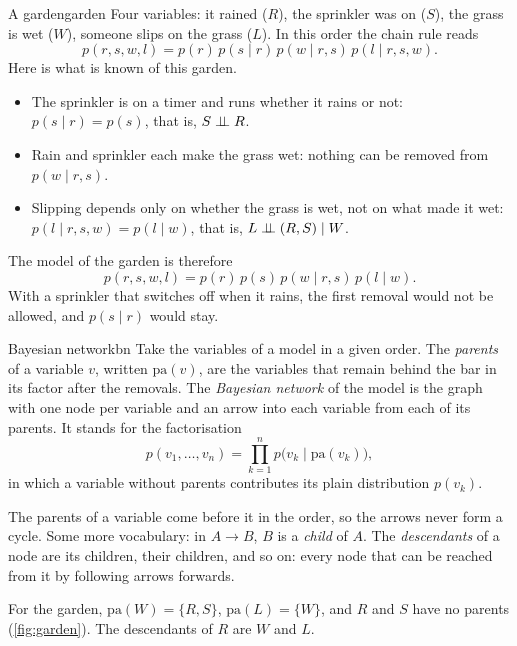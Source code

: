 \begin{example}{A garden}{garden}
Four variables: it rained ($R$), the sprinkler was on ($S$), the grass is
wet ($W$), someone slips on the grass ($L$). In this order the chain rule
reads
\[
  p(r,s,w,l)=p(r)\,p(s\mid r)\,p(w\mid r,s)\,p(l\mid r,s,w).
\]
Here is what is known of this garden.
\begin{itemize}[nosep]
  \item The sprinkler is on a timer and runs whether it rains or not:
    $p(s\mid r)=p(s)$, that is, $S\mathrel{\perp\!\!\!\perp} R$.
  \item Rain and sprinkler each make the grass wet: nothing can be removed
    from $p(w\mid r,s)$.
  \item Slipping depends only on whether the grass is wet, not on what
    made it wet: $p(l\mid r,s,w)=p(l\mid w)$, that is,
    $L\mathrel{\perp\!\!\!\perp}(R,S)\mid W$.
\end{itemize}
The model of the garden is therefore
\[
  p(r,s,w,l)=p(r)\,p(s)\,p(w\mid r,s)\,p(l\mid w).
\]
With a sprinkler that switches off when it rains, the first removal would
not be allowed, and $p(s\mid r)$ would stay.
\end{example}

\begin{definition}{Bayesian network}{bn}
Take the variables of a model in a given order. The \emph{parents} of a
variable $v$, written $\mathrm{pa}(v)$, are the variables that remain
behind the bar in its factor after the removals. The \emph{Bayesian
network} of the model is the graph with one node per variable and an arrow
into each variable from each of its parents. It stands for the
factorisation
\begin{equation}\label{eq:bnfactor}
  p(v_1,\dots,v_n)=\prod_{k=1}^n p\bigl(v_k\mid\mathrm{pa}(v_k)\bigr),
\end{equation}
in which a variable without parents contributes its plain distribution
$p(v_k)$.
\end{definition}

The parents of a variable come before it in the order, so the arrows never
form a cycle. Some more vocabulary: in $A\rightarrow B$, $B$ is a
\emph{child} of $A$. The \emph{descendants} of a node are its children,
their children, and so on: every node that can be reached from it by
following arrows forwards.

For the garden, $\mathrm{pa}(W)=\{R,S\}$, $\mathrm{pa}(L)=\{W\}$, and $R$
and $S$ have no parents (\cref{fig:garden}). The descendants of $R$ are
$W$ and $L$.


